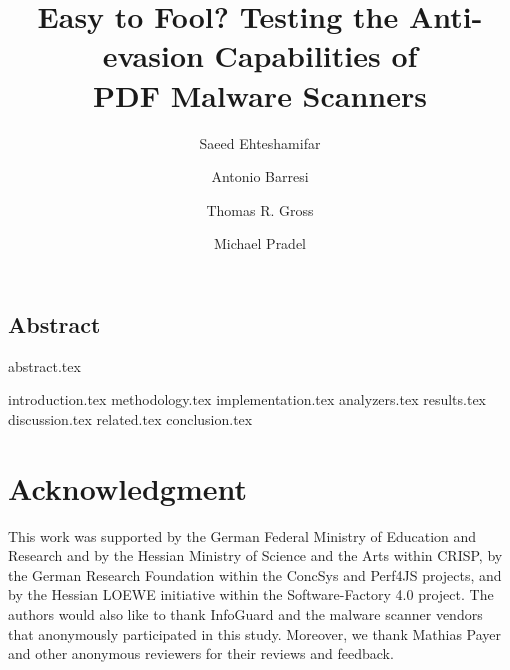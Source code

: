 \usepackage{enumitem}
\addtolength{\abovecaptionskip}{-3mm}




\title{Easy to Fool? Testing the Anti-evasion Capabilities of\\ PDF Malware Scanners}
% 

\author{Saeed Ehteshamifar}

\author{Antonio Barresi}

\author{Thomas R. Gross}

\author{Michael Pradel}


\maketitle

\subsection*{Abstract}
{abstract.tex}



{introduction.tex}
{methodology.tex}
{implementation.tex}
{analyzers.tex}
{results.tex}
{discussion.tex}
{related.tex}
{conclusion.tex}

\section*{Acknowledgment}
This work was supported by the German Federal Ministry of Education and
Research and by the Hessian Ministry of Science and the Arts within
CRISP, by the German Research Foundation within the ConcSys and Perf4JS
projects, and by the Hessian LOEWE initiative within the
Software-Factory 4.0 project.
The authors would also like to thank InfoGuard and the malware scanner vendors that anonymously participated in this study. Moreover, we thank Mathias Payer and other anonymous reviewers for their reviews and feedback.

